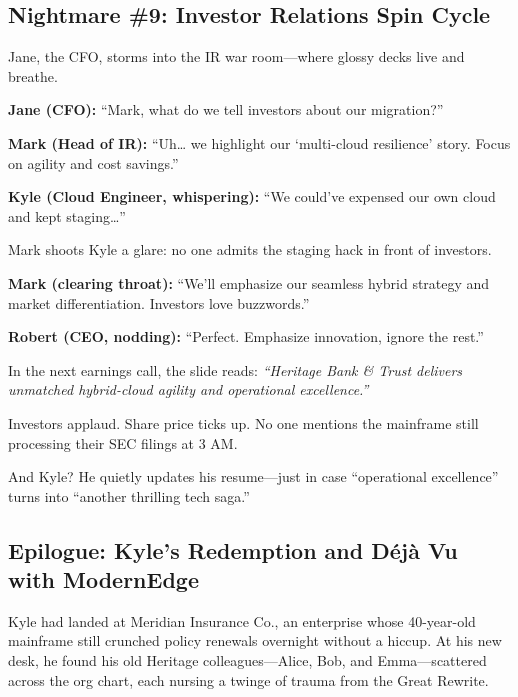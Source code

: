 \subsection{Nightmare \#9: Investor Relations Spin Cycle}

Jane, the CFO, storms into the IR war room—where glossy decks live and breathe.

\medskip

\textbf{Jane (CFO):} “Mark, what do we tell investors about our migration?”

\medskip

\textbf{Mark (Head of IR):} “Uh… we highlight our ‘multi-cloud resilience’ story.  
Focus on agility and cost savings.”

\medskip

\textbf{Kyle (Cloud Engineer, whispering):} “We could’ve expensed our own cloud  
and kept staging…”

\medskip

Mark shoots Kyle a glare: no one admits the staging hack in front of investors.

\medskip

\textbf{Mark (clearing throat):} “We’ll emphasize our seamless hybrid strategy  
and market differentiation. Investors love buzzwords.”

\medskip

\textbf{Robert (CEO, nodding):} “Perfect. Emphasize innovation, ignore the rest.”

\medskip

In the next earnings call, the slide reads:  
\emph{“Heritage Bank \& Trust delivers unmatched hybrid-cloud agility and  
operational excellence.”}

\medskip

Investors applaud. Share price ticks up. No one mentions the mainframe still  
processing their SEC filings at 3 AM.

\medskip

And Kyle? He quietly updates his resume—just in case “operational excellence”  
turns into “another thrilling tech saga.”  


\subsection{Epilogue: Kyle’s Redemption and Déjà Vu with ModernEdge}

Kyle had landed at Meridian Insurance Co., an enterprise whose 40-year-old  
mainframe still crunched policy renewals overnight without a hiccup. At his  
new desk, he found his old Heritage colleagues—Alice, Bob, and Emma—scattered  
across the org chart, each nursing a twinge of trauma from the Great Rewrite.

